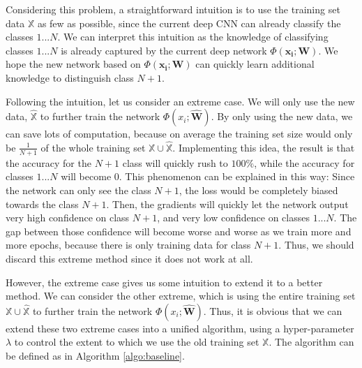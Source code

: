 Considering this problem, a straightforward intuition is to use the training set data $\mathbb{X}$ as few as possible, since the current deep CNN can already classify the classes $1...N$. We can interpret this intuition as the knowledge of classifying classes $1...N$ is already captured by the current deep network $\Phi(\mathbf{x_i}; \mathbf{W})$. We hope the new network based on $\Phi(\mathbf{x_i}; \mathbf{W})$ can quickly learn additional knowledge to distinguish class $N+1$. 

Following the intuition, let us consider an extreme case. We will only use the new data, $\hat{\mathbb{X}}$ to further train the network $\Phi(x_i; \hat{\mathbf{W}})$. By only using the new data, we can save lots of computation, because on average the training set size would only be $\frac{1}{N+1}$ of the whole training set $\mathbb{X}\cup \hat{\mathbb{X}}$. Implementing this idea, the result is that the accuracy for the $N+1$ class will quickly rush to $100\%$, while the accuracy for classes $1...N$ will become $0$. This phenomenon can be explained in this way: Since the network can only see the class $N+1$, the loss would be completely biased towards the class $N+1$. Then, the gradients will quickly let the network output very high confidence on class $N+1$, and very low confidence on classes $1...N$. The gap between those confidence will become worse and worse as we train more and more epochs, because there is only training data for class $N+1$. Thus, we should discard this extreme method since it does not work at all.

However, the extreme case gives us some intuition to extend it to a better method. We can consider the other extreme, which is using the entire training set $\mathbb{X}\cup \hat{\mathbb{X}}$ to further train the network $\Phi(x_i; \hat{\mathbf{W}})$. Thus, it is obvious that we can extend these two extreme cases into a unified algorithm, using a hyper-parameter $\lambda$ to control the extent to which we use the old training set $\mathbb{X}$. The algorithm can be defined as in Algorithm \ref{algo:baseline}.


